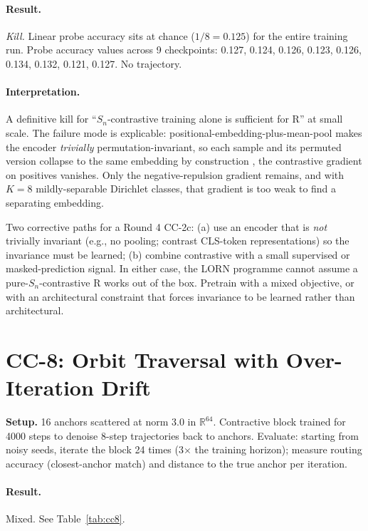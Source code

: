 \documentclass[10pt, twocolumn, a4paper]{article}
\newcommand{\R}{\mathbb{R}}
\newcommand{\Sn}{S_n}
\begin{document}
\paragraph{Result.} \emph{Kill.} Linear probe accuracy sits at chance ($1/8 = 0.125$) for the entire training run. Probe accuracy values across 9 checkpoints: 0.127, 0.124, 0.126, 0.123, 0.126, 0.134, 0.132, 0.121, 0.127. No trajectory.

\paragraph{Interpretation.} A definitive kill for ``$\Sn$-contrastive training alone is sufficient for R'' at small scale. The failure mode is explicable: positional-embedding-plus-mean-pool makes the encoder \emph{trivially} permutation-invariant, so each sample and its permuted version collapse to the same embedding by construction ,  the contrastive gradient on positives vanishes. Only the negative-repulsion gradient remains, and with $K=8$ mildly-separable Dirichlet classes, that gradient is too weak to find a separating embedding.

Two corrective paths for a Round 4 CC-2c: (a) use an encoder that is \emph{not} trivially invariant (e.g., no pooling; contrast CLS-token representations) so the invariance must be learned; (b) combine contrastive with a small supervised or masked-prediction signal. In either case, the LORN programme cannot assume a pure-$\Sn$-contrastive R works out of the box. Pretrain with a mixed objective, or with an architectural constraint that forces invariance to be learned rather than architectural.

\section{CC-8: Orbit Traversal with Over-Iteration Drift}

\textbf{Setup.} 16 anchors scattered at norm 3.0 in $\R^{64}$. Contractive block trained for 4000 steps to denoise 8-step trajectories back to anchors. Evaluate: starting from noisy seeds, iterate the block 24 times (3$\times$ the training horizon); measure routing accuracy (closest-anchor match) and distance to the true anchor per iteration.

\paragraph{Result.} Mixed. See Table~\ref{tab:cc8}.
\end{document}
